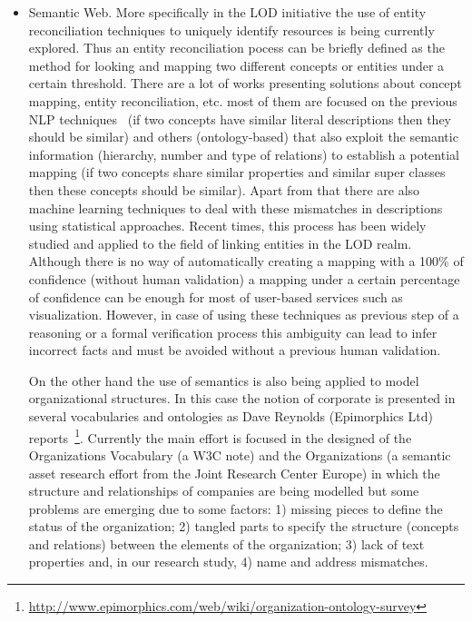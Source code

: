 \documentclass{llncs}
\begin{document}
\begin{itemize}
 \item Semantic Web. More specifically in the LOD initiative the use of entity reconciliation techniques to uniquely identify resources 
 is being currently explored. Thus an entity reconciliation pocess can be briefly defined as the method for looking and mapping two different 
 concepts or entities under a certain threshold. There are a lot of  works presenting solutions about concept mapping, entity reconciliation, etc. 
 most of them are focused on the previous NLP techniques~\cite{conf/www/MaaliCP11,Serimi} (if two concepts have similar literal descriptions then they should be similar) 
 and others (ontology-based) that also exploit the semantic information (hierarchy, number and type of relations) to establish a potential mapping 
 (if two concepts share similar properties and similar super classes then these concepts should be similar). Apart from that 
 there are also machine learning techniques to deal with these mismatches in descriptions using statistical approaches. Recent times, 
 this process has been widely studied and applied to the field of linking entities in the LOD realm. Although there is no way of automatically 
 creating a mapping with a 100\% of confidence (without human validation) a mapping under a certain percentage of confidence can be 
 enough for most of user-based services such as visualization. However, in case of using these techniques as previous step of a reasoning or 
 a formal verification process this ambiguity can lead to infer incorrect facts and must be avoided without a previous human validation. 

 On the other hand the use of semantics is also being applied to model organizational structures. In this case the notion 
 of corporate is presented in several vocabularies and ontologies as Dave Reynolds (Epimorphics Ltd) reports~\footnote{\url{http://www.epimorphics.com/web/wiki/organization-ontology-survey}}. 
 Currently the main effort is focused in the designed of the Organizations Vocabulary (a W3C note) and 
 the Organizations (a semantic asset research effort from the Joint Research Center Europe) in which the structure and 
 relationships of companies are being modelled but some problems are emerging due to some factors: 
 1) missing pieces to define the status of the organization; 2) tangled parts to specify the structure (concepts and relations) 
 between the elements of the organization; 3) lack of text properties and, in our research study, 4) name and address mismatches. 


\end{itemize}
\end{document}
